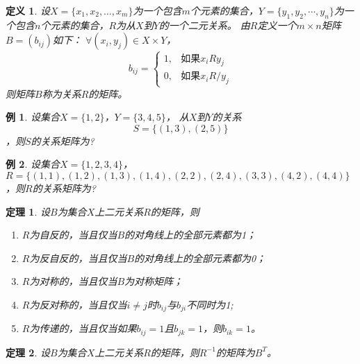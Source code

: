 \documentclass{book}[oneside]
\newtheorem{Def}{定义}[chapter]
\newtheorem{Thm}{定理}[chapter]
\newtheorem{Example}{例}[chapter]
\begin{document}
\begin{CJK*}{UTF8}{gbsn}
   \begin{Def}
    设$X=\{x_1, x_2, \ldots, x_m\}$为一个包含$m$个元素的集合，$Y=\{y_1, y_2,
    \cdots, y_n\}$为一个包含$n$个元素的集合，$R$为从$X$到$Y$的一个二元关系。
    由$R$定义一个$m \times n$矩阵$B = (b_{ij})$如下： $\forall (x_i, y_j) \in X \times Y$，
\[
    b_{ij}=
      \begin{cases}
        1,&\text{如果}x_iRy_j\\
        0,&\text{如果}x_iR\!\!\! / y_j
      \end{cases}
\]
    则矩阵$B$称为关系$R$的矩阵。
  \end{Def}

  \begin{Example}
    设集合$X=\{1,2\}$，$Y=\{3,4,5\}$， 从$X$到$Y$的关系\[S=\{(1,3), (2, 5)\}\]，则$S$的关系矩阵为?
  \end{Example}
  
  \begin{Example}
    设集合$X = \{1,2,3,4\}$，$R = \{(1,1),(1,2),(1,3),(1,4),(2,2),(2,4),(3,3),(4,2),(4,4)\}$，则$R$的关系矩阵为?
  \end{Example}

  \begin{Thm}
  设$B$为集合$X$上二元关系$R$的矩阵，则
  \begin{enumerate}
  \item $R$为自反的，当且仅当$B$的对角线上的全部元素都为1；
  \item $R$为反自反的，当且仅当$B$的对角线上的全部元素都为0；
  \item $R$为对称的，当且仅当$B$为对称矩阵；
  \item $R$为反对称的，当且仅当$i \neq j$时$b_{ij}$与$b_{ji}$不同时为1;
  \item $R$为传递的，当且仅当如果$b_{ij}=1$且$b_{jk}=1$，则$b_{ik}=1$。
  \end{enumerate}
\end{Thm}


  \begin{Thm}
    设$B$为集合$X$上二元关系$R$的矩阵，则$R^{-1}$的矩阵为$B^{T}$。
  \end{Thm}



\end{CJK*}
\end{document}
